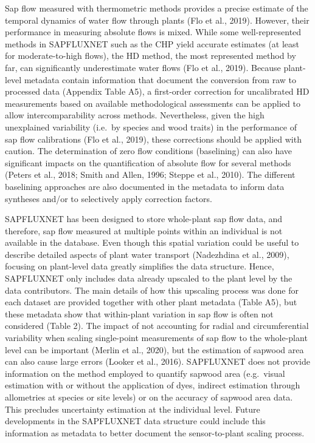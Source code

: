 \documentclass[11pt,twoside]{reedthesis}
\begin{document}
Sap flow measured with thermometric methods provides a precise estimate
of the temporal dynamics of water flow through plants (Flo et al.,
2019). However, their performance in measuring absolute flows is mixed.
While some well-represented methods in SAPFLUXNET such as the CHP yield
accurate estimates (at least for moderate-to-high flows), the HD method,
the most represented method by far, can significantly underestimate
water flows (Flo et al., 2019). Because plant-level metadata contain
information that document the conversion from raw to processed data
(Appendix Table A5), a first-order correction for uncalibrated HD
measurements based on available methodological assessments can be
applied to allow intercomparability across methods. Nevertheless, given
the high unexplained variability (i.e.~by species and wood traits) in
the performance of sap flow calibrations (Flo et al., 2019), these
corrections should be applied with caution. The determination of zero
flow conditions (baselining) can also have significant impacts on the
quantification of absolute flow for several methods (Peters et al.,
2018; Smith and Allen, 1996; Steppe et al., 2010). The different
baselining approaches are also documented in the metadata to inform data
syntheses and/or to selectively apply correction factors.\par

SAPFLUXNET has been designed to store whole-plant sap flow data, and
therefore, sap flow measured at multiple points within an individual is
not available in the database. Even though this spatial variation could
be useful to describe detailed aspects of plant water transport
(Nadezhdina et al., 2009), focusing on plant-level data greatly
simplifies the data structure. Hence, SAPFLUXNET only includes data
already upscaled to the plant level by the data contributors. The main
details of how this upscaling process was done for each dataset are
provided together with other plant metadata (Table A5), but these
metadata show that within-plant variation in sap flow is often not
considered (Table 2). The impact of not accounting for radial and
circumferential variability when scaling single-point measurements of
sap flow to the whole-plant level can be important (Merlin et al.,
2020), but the estimation of sapwood area can also cause large errors
(Looker et al., 2016). SAPFLUXNET does not provide information on the
method employed to quantify sapwood area (e.g.~visual estimation with or
without the application of dyes, indirect estimation through allometries
at species or site levels) or on the accuracy of sapwood area data. This
precludes uncertainty estimation at the individual level. Future
developments in the SAPFLUXNET data structure could include this
information as metadata to better document the sensor-to-plant scaling
process.\par
\end{document}
